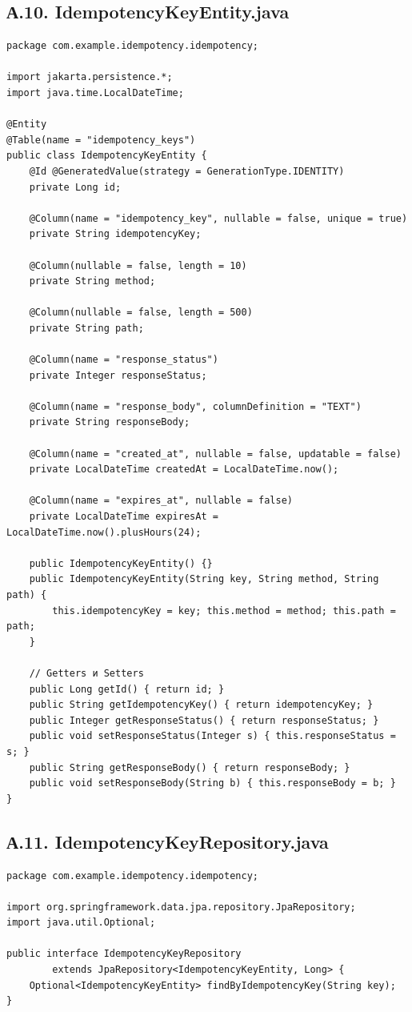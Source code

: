 \subsection*{А.10. IdempotencyKeyEntity.java}
\begin{lstlisting}[caption={IdempotencyKeyEntity.java --- сущность ключа идемпотентности}]
package com.example.idempotency.idempotency;

import jakarta.persistence.*;
import java.time.LocalDateTime;

@Entity
@Table(name = "idempotency_keys")
public class IdempotencyKeyEntity {
    @Id @GeneratedValue(strategy = GenerationType.IDENTITY)
    private Long id;

    @Column(name = "idempotency_key", nullable = false, unique = true)
    private String idempotencyKey;

    @Column(nullable = false, length = 10)
    private String method;

    @Column(nullable = false, length = 500)
    private String path;

    @Column(name = "response_status")
    private Integer responseStatus;

    @Column(name = "response_body", columnDefinition = "TEXT")
    private String responseBody;

    @Column(name = "created_at", nullable = false, updatable = false)
    private LocalDateTime createdAt = LocalDateTime.now();

    @Column(name = "expires_at", nullable = false)
    private LocalDateTime expiresAt = LocalDateTime.now().plusHours(24);

    public IdempotencyKeyEntity() {}
    public IdempotencyKeyEntity(String key, String method, String path) {
        this.idempotencyKey = key; this.method = method; this.path = path;
    }

    // Getters и Setters
    public Long getId() { return id; }
    public String getIdempotencyKey() { return idempotencyKey; }
    public Integer getResponseStatus() { return responseStatus; }
    public void setResponseStatus(Integer s) { this.responseStatus = s; }
    public String getResponseBody() { return responseBody; }
    public void setResponseBody(String b) { this.responseBody = b; }
}
\end{lstlisting}

\subsection*{А.11. IdempotencyKeyRepository.java}
\begin{lstlisting}[caption={IdempotencyKeyRepository.java}]
package com.example.idempotency.idempotency;

import org.springframework.data.jpa.repository.JpaRepository;
import java.util.Optional;

public interface IdempotencyKeyRepository
        extends JpaRepository<IdempotencyKeyEntity, Long> {
    Optional<IdempotencyKeyEntity> findByIdempotencyKey(String key);
}
\end{lstlisting}

